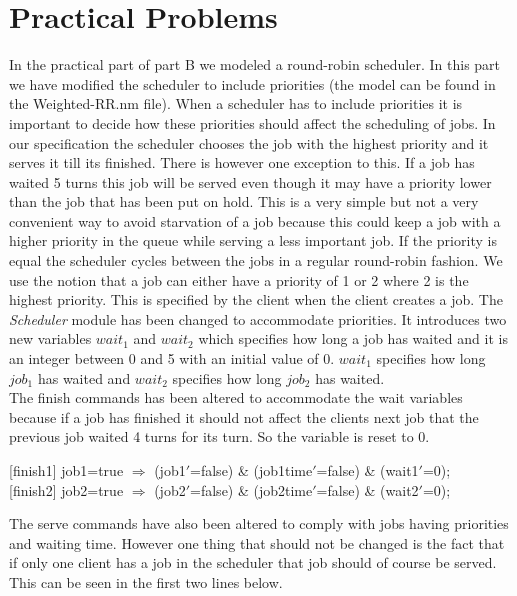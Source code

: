 \documentclass[12pt]{report}
\begin{document}
\section*{Practical Problems}
In the practical part of part B we modeled a round-robin scheduler. In this part we have modified the scheduler to include priorities (the model can be found in the Weighted-RR.nm file). When a scheduler has to include priorities it is important to decide how these priorities should affect the scheduling of jobs. In our specification the scheduler chooses the job with the highest priority and it serves it till its finished. There is however one exception to this. If a job has waited 5 turns this job will be served even though it may have a priority lower than the job that has been put on hold. This is a very simple but not a very convenient way to avoid starvation of a job because this could keep a job with a higher priority in the queue while serving a less important job. If the priority is equal the scheduler cycles between the jobs in a regular round-robin fashion. We use the notion that a job can either have a priority of 1 or 2 where 2 is the highest priority. This is specified by the client when the client creates a job. The \emph{Scheduler} module has been changed to accommodate priorities. It introduces two new variables $wait_1$ and $wait_2$ which specifies how long a job has waited and it is an integer between 0 and 5 with an initial value of 0. $wait_1$ specifies how long $job_1$ has waited and $wait_2$ specifies how long $job_2$ has waited.\\
The finish commands has been altered to accommodate the wait variables because if a job has finished it should not affect the clients next job that the previous job waited 4 turns for its turn. So the variable is reset to 0.\\
\begin{center}
{[finish1]} job1=true $\Rightarrow$ (job1$'$=false) \& (job1time$'$=false) \& (wait1$'$=0);\\
{[finish2]} job2=true $\Rightarrow$ (job2$'$=false) \& (job2time$'$=false) \& (wait2$'$=0);
\end{center}
The serve commands have also been altered to comply with jobs having priorities and waiting time. However one thing that should not be changed is the fact that if only one client has a job in the scheduler that job should of course be served. This can be seen in the first two lines below.
\end{document}
